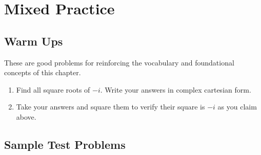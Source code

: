 \section{Mixed Practice}
\subsection{Warm Ups}
These are good problems for reinforcing the vocabulary and foundational concepts of this chapter.

\begin{exercise}{\Coffeecup \Coffeecup}

\begin{enumerate}[label=\alph*.)] 

\item Find all square roots of $-i$. Write your answers in complex cartesian form.
\item Take your answers and square them to verify their square is $-i$ as you claim above.
\end{enumerate}

\end{exercise}


\subsection{Sample Test Problems}

